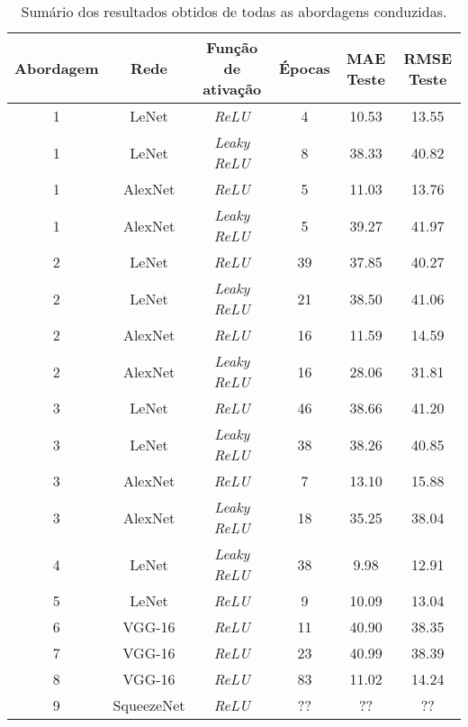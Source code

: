 \begin{table}[!ht]
	\caption{Sumário dos resultados obtidos de todas as abordagens conduzidas.}
	\label{tab:resultsAll}
  \begin{center}
		\begin{tabular}{cccccc}
			\toprule
			Abordagem & Rede & Função de ativação & Épocas & MAE Teste & RMSE Teste \\
			\midrule
			1 & LeNet & \emph{ReLU}  & 4 & 10.53 & 13.55 \\
			1 & LeNet & \emph{Leaky ReLU} & 8 & 38.33 & 40.82 \\
			1 & AlexNet & \emph{ReLU}  & 5 & 11.03 & 13.76 \\
			1 & AlexNet & \emph{Leaky ReLU} & 5 & 39.27 & 41.97 \\
			2 & LeNet & \emph{ReLU}  & 39 & 37.85 & 40.27 \\
			2 & LeNet & \emph{Leaky ReLU} & 21 & 38.50 & 41.06 \\
			2 & AlexNet & \emph{ReLU}  & 16 & 11.59 & 14.59 \\
			2 & AlexNet & \emph{Leaky ReLU} & 16 & 28.06 & 31.81 \\
			3 & LeNet & \emph{ReLU} & 46 &  38.66 & 41.20 \\
			3 & LeNet & \emph{Leaky ReLU} &  38 & 38.26 & 40.85 \\
			3 & AlexNet & \emph{ReLU} & 7 & 13.10 & 15.88 \\
			3 & AlexNet & \emph{Leaky ReLU} & 18 & 35.25 & 38.04 \\
			4 &	LeNet & \emph{Leaky ReLU} & 38 & 9.98 & 12.91 \\
			5 & LeNet & \emph{ReLU} & 9 &  10.09 & 13.04 \\
			6 & VGG-16 & \emph{ReLU} & 11 & 40.90 & 38.35 \\
			7 & VGG-16 & \emph{ReLU} & 23 & 40.99 & 38.39 \\
			8 & VGG-16 & \emph{ReLU} & 83 & 11.02 & 14.24 \\
			9 & SqueezeNet & \emph{ReLU} & ?? & ?? & ?? \\
			\bottomrule
		\end{tabular}
  \end{center}
\end{table}
